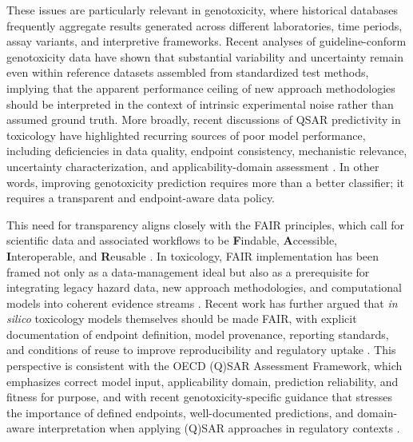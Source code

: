 These issues are particularly relevant in genotoxicity, where historical databases frequently aggregate results generated 
across different laboratories, time periods, assay variants, and interpretive frameworks. Recent analyses of guideline-conform 
genotoxicity data have shown that substantial variability and uncertainty remain even within reference datasets assembled 
from standardized test methods, implying that the apparent performance ceiling of new approach methodologies 
should be interpreted in the context of intrinsic experimental noise rather than assumed ground truth. More broadly, 
recent discussions of QSAR predictivity in toxicology have highlighted recurring sources of poor model performance, 
including deficiencies in data quality, endpoint consistency, mechanistic relevance, uncertainty characterization, 
and applicability-domain assessment \cite{Raitano2026,Cronin2025}. In other words, improving genotoxicity prediction 
requires more than a better classifier; it requires a transparent and endpoint-aware data policy.


This need for transparency aligns closely with the FAIR principles, which call for scientific data and associated workflows 
to be \textbf{F}indable, \textbf{A}ccessible, \textbf{I}nteroperable, and \textbf{R}eusable \cite{Wilkinson2016}. 
In toxicology, FAIR implementation has been framed not only as a data-management ideal but also as a prerequisite for 
integrating legacy hazard data, new approach methodologies, and computational models into coherent evidence streams \cite{Watford2019}. 
Recent work has further argued that \textit{in silico} toxicology models themselves should be made FAIR, 
with explicit documentation of endpoint definition, model provenance, reporting standards, and conditions of reuse to 
improve reproducibility and regulatory uptake \cite{Cronin2023}. This perspective is consistent with 
the OECD (Q)SAR Assessment Framework, which emphasizes correct model input, applicability domain, prediction reliability,
and fitness for purpose, and with recent genotoxicity-specific guidance that stresses the importance of defined endpoints, 
well-documented predictions, and domain-aware interpretation when applying (Q)SAR approaches in regulatory contexts \cite{OECDQAF2024,COM2026}.

